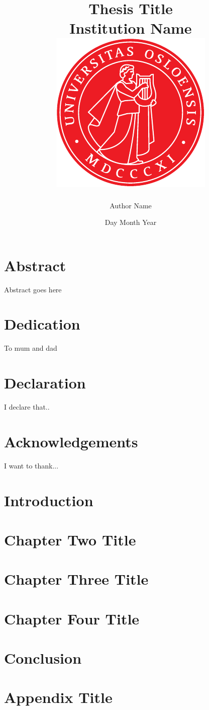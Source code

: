 \documentclass[12pt]{report}
\title{
{Thesis Title}\\
{\Large Institution Name}\\
{\includegraphics{uio.pdf}}
}
\author{Author Name}
\date{Day Month Year}
\begin{document}
\maketitle

\chapter*{Abstract}
Abstract goes here \parencite[e.g.][page 300]{einstein}
 
\chapter*{Dedication}
To mum and dad
 
\chapter*{Declaration}
I declare that..
 
\chapter*{Acknowledgements}
I want to thank...
 
\tableofcontents

\chapter{Introduction}

 
\chapter{Chapter Two Title}

 
\chapter{Chapter Three Title}

 
\chapter{Chapter Four Title}

 
\chapter{Conclusion}


\appendix
\chapter{Appendix Title}


\printbibliography
\end{document}

